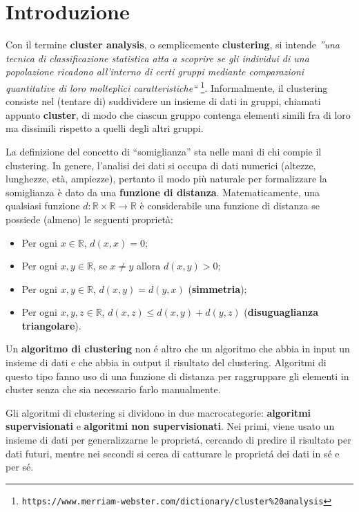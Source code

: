 \documentclass[12pt]{report}
\begin{document}
	\chapter{Introduzione}

		Con il termine \textbf{cluster analysis}, o semplicemente
		\textbf{clustering}, si intende \emph{''una tecnica di
		classificazione statistica atta a scoprire se gli individui
		di una popolazione ricadono all'interno di certi gruppi mediante
		comparazioni quantitative di loro molteplici caratteristiche``}
		\footnote{\texttt{https://www.merriam-webster.com/dictionary/cluster\%20analysis}}.
		Informalmente, il clustering consiste nel (tentare di) suddividere
		un insieme di dati in gruppi, chiamati appunto \textbf{cluster},
		di modo che ciascun gruppo contenga elementi simili fra di loro
		ma dissimili rispetto a quelli degli altri gruppi.

		La definizione del concetto di ``somiglianza'' sta nelle mani di
		chi compie il clustering. In genere, l'analisi dei dati si occupa
		di dati numerici (altezze, lunghezze, età, ampiezze), pertanto il
		modo più naturale per formalizzare la somiglianza è dato da una
		\textbf{funzione di distanza}. Matematicamente, una qualsiasi
		funzione $d: \mathbb{R} \times \mathbb{R} \rightarrow \mathbb{R}$
		è considerabile una funzione di distanza se possiede (almeno) le
		seguenti proprietà:

		\begin{itemize}
			\item
			Per ogni $x \in \mathbb{R}$, $d(x, x) = 0$;
			\item
			Per ogni $x, y \in \mathbb{R}$, se $x \neq y$ allora $d(x, y) > 0$;
			\item
			Per ogni $x, y \in \mathbb{R}$, $d(x, y) = d(y, x)$
			(\textbf{simmetria});
			\item
			Per ogni $x, y, z \in \mathbb{R}$, $d(x, z) \leq d(x, y) + d(y, z)$
			(\textbf{disuguaglianza triangolare}).
		\end{itemize}

		Un \textbf{algoritmo di clustering} non é altro che un algoritmo
		che abbia in input un insieme di dati e che abbia in output il
		risultato del clustering. Algoritmi di questo tipo fanno uso di
		una funzione di distanza per raggruppare gli elementi in cluster
		senza che sia necessario farlo manualmente.

		Gli algoritmi di clustering si dividono in due macrocategorie:
		\textbf{algoritmi supervisionati} e \textbf{algoritmi non
		supervisionati}. Nei primi, viene usato un insieme di dati per
		generalizzarne le proprietá, cercando di predire il risultato
		per dati futuri, mentre nei secondi si cerca di catturare le
		proprietá dei dati in sé e per sé.
\end{document}
